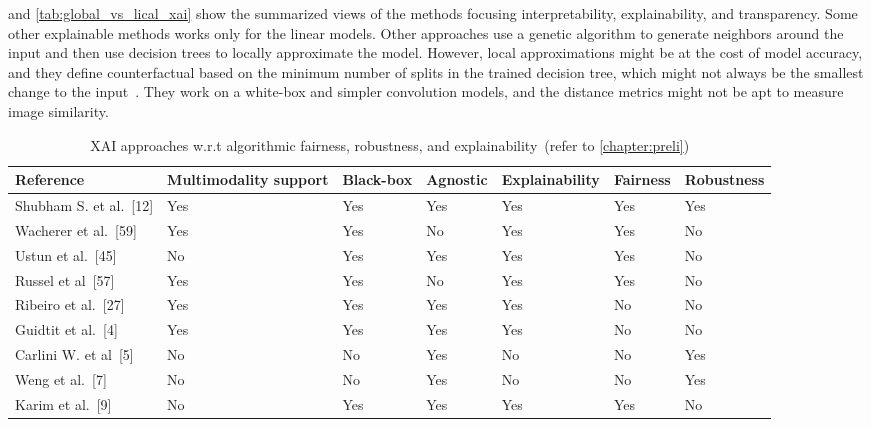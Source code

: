 \hspace*{3.5mm}  and \cref{tab:global_vs_lical_xai} show the summarized views of the methods focusing interpretability, explainability, and transparency. Some other explainable methods works only for the linear models. Other approaches use a genetic algorithm to generate neighbors around the input and then use decision trees to locally approximate the model. However, local approximations might be at the cost of model accuracy, and they define counterfactual based on the minimum number of splits in the trained decision tree, which might not always be the smallest change to the input~\cite{li2017comprehensive}. They work on a white-box and simpler convolution models, and the distance metrics might not be apt to measure image similarity. 

\begin{table}[h]
    \centering
    \caption{XAI approaches w.r.t algorithmic fairness, robustness, and explainability~(refer to \cref{chapter:preli})}
    \label{tab:multimodal_xai_approaches}
    \scriptsize
    \vspace{-2mm}
    \begin{tabular}{l|l|l|l|l|l|l} 
        \hline
        \textbf{Reference}                & \textbf{Multimodality support} & \textbf{Black-box} & \textbf{Agnostic} & \textbf{Explainability} & \textbf{Fairness} & \textbf{Robustness}  \\ 
        \hline
        Shubham S. et al.~[12]   & Yes                   & Yes       & Yes            & Yes            & Yes      & Yes         \\ 
        \hline
        Wacherer et al.~[59]     & Yes                   & Yes       & No             & Yes            & Yes      & No          \\ 
        \hline
        Ustun et al.~[45]        & No                    & Yes       & Yes            & Yes            & Yes      & No          \\ 
        \hline
        Russel et al~[57]       & Yes                   & Yes       & No             & Yes            & Yes      & No          \\ 
        \hline
        Ribeiro et al.~[27]      & Yes                   & Yes       & Yes            & Yes            & No       & No          \\ 
        \hline
        Guidtit et al.~[4]      & Yes                   & Yes       & Yes            & Yes            & No       & No          \\ 
        \hline
        Carlini W. et al~[5] & No                    & No        & Yes            & No             & No       & Yes         \\ 
        \hline
        Weng et al.~[7]          & No                    & No        & Yes            & No             & No       & Yes         \\ 
        \hline
        Karim et al.~[9]        & No                    & Yes       & Yes            & Yes            & Yes      & No          \\
        \hline
    \end{tabular}
    \vspace{-4mm}
\end{table}

